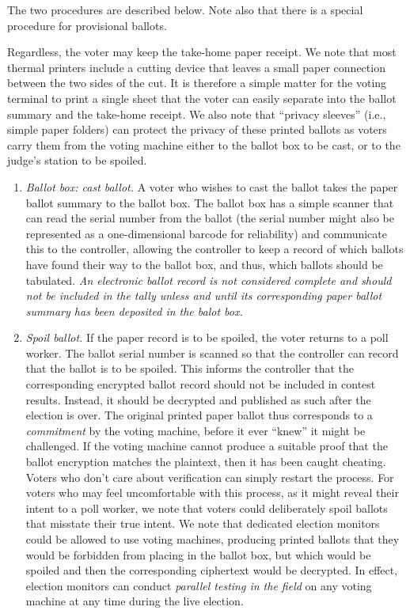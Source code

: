 \begin{enumerate}
 The two procedures are described below. 
 Note also that there is a special procedure for provisional ballots.

 Regardless, the voter may keep the take-home paper receipt.
 We note that most thermal printers include a cutting device that leaves a
 small paper connection between the two sides of the cut.
 It is therefore a simple matter for the voting terminal to print a single
 sheet that the voter can easily separate into the ballot summary and the
 take-home receipt.
 We also note that ``privacy sleeves'' (i.e., simple paper folders) can protect the privacy of these printed ballots as voters carry them from the voting machine either to the ballot box
 to be cast, or to the judge's station to be spoiled.

\begin{enumerate}
\item  {\em Ballot box: cast ballot.}
A voter who wishes to cast the ballot takes the paper ballot summary to the ballot box.
The ballot box has a simple scanner that can read the serial number from the ballot
(the serial number might also be represented as a one-dimensional barcode for reliability)
and communicate this to the controller, allowing the controller to keep a record of which ballots have found their way to the ballot box, and thus, which ballots should be tabulated. 
{\em An electronic ballot record is not considered complete and should not be
 included in the tally unless and until its corresponding paper ballot summary has
 been deposited in the balot box.}

\item {\em Spoil ballot.}
If the paper record is to be spoiled, the voter returns to a poll worker.
The ballot serial number is scanned so that the controller can record
that the ballot is to be spoiled. 
This informs the controller that the corresponding encrypted ballot 
record should not be included in contest results.
Instead, it should be decrypted and published as such after the election is over.
The original printed paper ballot thus corresponds to a {\em commitment\/} 
by the voting machine, before it ever ``knew'' it might be challenged.
 If the voting machine cannot produce a suitable proof that the ballot 
 encryption matches the plaintext,
 then it has been caught cheating.
 Voters who don't care about verification can simply restart the process.
 For voters who may feel uncomfortable with this process,
 as it might reveal their intent to a poll worker,
 we note that voters could deliberately spoil ballots that misstate their true intent. 
 We note that dedicated election monitors could be allowed to use voting machines, 
 producing printed ballots that they would be forbidden from placing in the ballot box, 
 but which would be spoiled and then the corresponding ciphertext would be decrypted. 
 In effect, election monitors can conduct 
 {\em parallel testing in the field\/} on any voting machine at any time during the live election.



\end{enumerate}
\end{enumerate}
